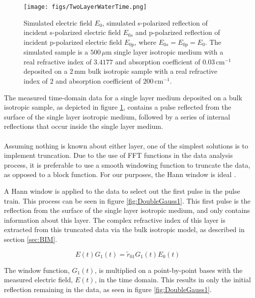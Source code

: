 \begin{figure}[H]
\begin{center}
	 \texttt{[image: figs/TwoLayerWaterTime.png]}
	 \caption[Simulated example of a single layer isotropic medium deposited on a bulk isotropic sample]{Simulated electric field $E_{0}$, simulated s-polarized reflection of incident s-polarized electric field $E_{0s}$ and p-polarized reflection of incident p-polarized electric field $E_{0p}$, where $E_{0s} = E_{0p} = E_{0}$. The simulated sample is a $500\,\mu $m single layer isotropic medium with a real refractive index of $3.4177$ and absorption coefficient of $0.03\,\mbox{cm}^{-1}$ deposited on a $2\,\mbox{mm}$ bulk isotropic sample with a real refractive index of $2$ and absorption coefficient of $200\,\mbox{cm}^{-1}$.}
   \label{fig:DoubleTime}
\end{center}
\end{figure}

The measured time-domain data for a single layer medium deposited on a bulk isotropic sample, as depicted in figure \ref{fig:DoubleTime}, contains a pulse reflected from the surface of the single layer isotropic medium, followed by a series of internal reflections that occur inside the single layer medium.
\paragraph{}
Assuming nothing is known about either layer, one of the simplest solutions is to implement truncation. Due to the use of FFT functions in the data analysis process, it is preferable to use a smooth windowing function to truncate the data, as opposed to a block function. For our purposes, the Hann window is ideal \cite{ni2019}.

A Hann window is applied to the data to select out the first pulse in the pulse train. This process can be seen in figure \ref{fig:DoubleGauss1}. This first pulse is the reflection from the surface of the single layer isotropic medium, and only contains information about this layer. The complex refractive index of this layer is extracted from this truncated data via the bulk isotropic model, as described in section \ref{sec:BIM}.

\begin{equation}
E(t)G_{1}(t) = \widetilde{r}_{01}G_{1}(t)E_{0}(t)
\label{eq:Gaussian1}
\end{equation}

The window function, $G_{1}(t)$, is multiplied on a point-by-point bases with the measured electric field, $E(t)$, in the time domain. This results in only the initial reflection remaining in the data, as seen in figure \ref{fig:DoubleGauss1}.

